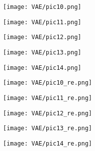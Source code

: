 \begin{figure}[t]
    \subfigure
    {
        \begin{minipage}{0.12\linewidth}
        \texttt{[image: VAE/pic10.png]}
        \end{minipage}
    }
    \subfigure
    {
        \begin{minipage}{0.12\linewidth}
        \texttt{[image: VAE/pic11.png]}
        \end{minipage}
    }
    \subfigure
    {
        \begin{minipage}{0.12\linewidth}
        \texttt{[image: VAE/pic12.png]}
        \end{minipage}
    }
    \subfigure
    {
        \begin{minipage}{0.12\linewidth}
        \texttt{[image: VAE/pic13.png]}
        \end{minipage}
    }
    \subfigure
    {
        \begin{minipage}{0.12\linewidth}
        \texttt{[image: VAE/pic14.png]}
        \end{minipage}
    }
    \subfigure
    {
        \begin{minipage}{0.12\linewidth}
        \texttt{[image: VAE/pic10\_re.png]}
        \end{minipage}
    }
    \subfigure
    {
        \begin{minipage}{0.12\linewidth}
        \texttt{[image: VAE/pic11\_re.png]}
        \end{minipage}
    }
    \subfigure
    {
        \begin{minipage}{0.12\linewidth}
        \texttt{[image: VAE/pic12\_re.png]}
        \end{minipage}
    }
    \subfigure
    {
        \begin{minipage}{0.12\linewidth}
        \texttt{[image: VAE/pic13\_re.png]}
        \end{minipage}
    }
    \subfigure
    {
        \begin{minipage}{0.12\linewidth}
        \texttt{[image: VAE/pic14\_re.png]}
        \end{minipage}
    }
    
    \vspace{1mm}
    \hrulefill
    \vspace{1mm}
    

\end{figure}

